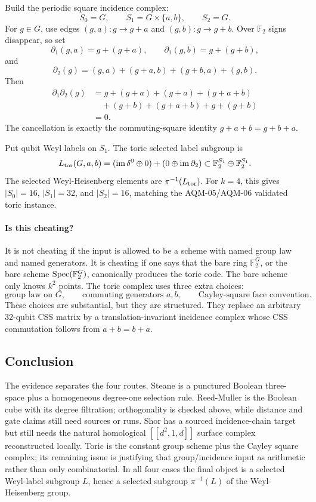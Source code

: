 Build the periodic square incidence complex:
\[
  S_0=G,\qquad S_1=G\times\{a,b\},\qquad S_2=G .
\]
For \(g\in G\), use edges \((g,a):g\to g+a\) and \((g,b):g\to g+b\).  Over
\(\mathbb F_2\) signs disappear, so set
\[
  \partial_1(g,a)=g+(g+a),\qquad
  \partial_1(g,b)=g+(g+b),
\]
and
\[
  \partial_2(g)=(g,a)+(g+a,b)+(g+b,a)+(g,b).
\]
Then
\[
\begin{aligned}
\partial_1\partial_2(g)
&=g+(g+a)+(g+a)+(g+a+b)\\
&\quad +(g+b)+(g+a+b)+g+(g+b)\\
&=0 .
\end{aligned}
\]
The cancellation is exactly the commuting-square identity \(g+a+b=g+b+a\).

Put qubit Weyl labels on \(S_1\).  The toric selected label subgroup is
\[
  L_{\rm tor}(G,a,b)
  =
  (\operatorname{im}\delta^0\oplus0)+(0\oplus\operatorname{im}\partial_2)
  \subset \mathbb F_2^{S_1}\oplus\mathbb F_2^{S_1}.
\]
The selected Weyl-Heisenberg elements are \(\pi^{-1}(L_{\rm tor})\).  For
\(k=4\), this gives \(|S_0|=16\), \(|S_1|=32\), and \(|S_2|=16\), matching the
AQM-05/AQM-06 validated toric instance.

\paragraph{Is this cheating?}
It is not cheating if the input is allowed to be a scheme with named group law
and named generators.  It is cheating if one says that the bare ring
\(\mathbb F_2^G\), or the bare scheme \(\operatorname{Spec}(\mathbb F_2^G)\), canonically
produces the toric code.  The bare scheme only knows \(k^2\) points.  The toric
complex uses three extra choices:
\[
  \text{group law on }G,\qquad
  \text{commuting generators }a,b,\qquad
  \text{Cayley-square face convention}.
\]
These choices are substantial, but they are structured.  They replace an
arbitrary \(32\)-qubit CSS matrix by a translation-invariant incidence complex
whose CSS commutation follows from \(a+b=b+a\).

\subsection{Conclusion}

The evidence separates the four routes.  Steane is a punctured Boolean
three-space plus a homogeneous degree-one selection rule.  Reed-Muller is the
Boolean cube with its degree filtration; orthogonality is checked above, while
distance and gate claims still need sources or runs.  Shor has a sourced
incidence-chain target but still needs the natural homological
\([[d^2,1,d]]\) surface complex reconstructed locally.  Toric is the constant
group scheme plus the Cayley square complex; its remaining issue is justifying
that group/incidence input as arithmetic rather than only combinatorial.  In
all four cases the final object is a selected Weyl-label subgroup \(L\), hence
a selected subgroup \(\pi^{-1}(L)\) of the Weyl-Heisenberg group.
